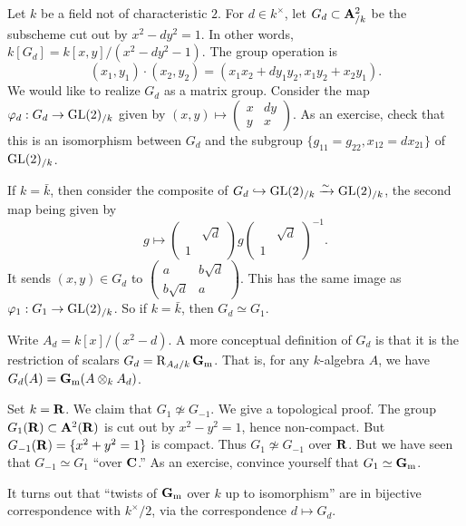 \begin{example}
Let $k$ be a field not of characteristic $2$. For $d\in k^\times$, let 
$G_d\subset \mathbf{A}_{/k}^2$ be the subscheme cut out by $x^2-d y^2=1$. In 
other words, $k[G_d]=k[x,y]/(x^2-d y^2-1)$. The group operation is 
\[
  (x_1,y_1)\cdot (x_2,y_2) = (x_1 x_2+d y_1 y_2, x_1 y_2+x_2 y_1) .
\]
We would like to realize $G_d$ as a matrix group. Consider the map 
$\varphi_d:G_d\to \operatorname{GL}(2)_{/k}$ given by 
$(x,y)\mapsto \begin{pmatrix} x & d y \\ y & x\end{pmatrix}$. As an exercise, 
check that this is an isomorphism between $G_d$ and the subgroup 
$\{g_{11}=g_{22},x_{12}=d x_{21}\}$ of $\operatorname{GL}(2)_{/k}$. 

If $k=\bar k$, then consider the composite of $G_d\hookrightarrow \operatorname{GL}(2)_{/k}\xrightarrow\sim \operatorname{GL}(2)_{/k}$, 
the second map being given by 
\[
  g\mapsto \begin{pmatrix} & \sqrt d \\ 1 \end{pmatrix} g \begin{pmatrix} & \sqrt d \\ 1 \end{pmatrix}^{-1} .
\]
It sends $(x,y)\in G_d$ to $\begin{pmatrix} a & b\sqrt d \\ b\sqrt d & a \end{pmatrix}$. 
This has the same image as $\varphi_1:G_1\to \operatorname{GL}(2)_{/k}$. So if $k=\bar k$, then 
$G_d\simeq G_1$. 
\end{example}

\begin{hard}
Write $A_d=k[x]/(x^2-d)$. A more conceptual definition of $G_d$ is that it is 
the restriction of scalars $G_d=\operatorname{R}_{A_d/k} \mathbf{G}_\mathrm{m}$. That is, for any 
$k$-algebra $A$, we have $G_d(A) = \mathbf{G}_\mathrm{m}(A\otimes_k A_d)$. 
\end{hard}

\begin{example}
Set $k=\mathbf{R}$. We claim that $G_1\not\simeq G_{-1}$. We give a topological 
proof. The group $G_1(\mathbf{R})\subset \mathbf{A}^2(\mathbf{R})$ is cut out by $x^2-y^2=1$, hence 
non-compact. But $G_{-1}(\mathbf{R})=\{x^2+y^2=1\}$ is compact. Thus 
$G_1\not\simeq G_{-1}$ over $\mathbf{R}$. 
But we have seen that $G_{-1}\simeq G_1$ ``over $\mathbf{C}$.'' As an exercise, 
convince yourself that $G_1\simeq \mathbf{G}_\mathrm{m}$. 
\end{example}

It turns out that ``twists of $\mathbf{G}_\mathrm{m}$ over $k$ up to isomorphism'' are in 
bijective correspondence with $k^\times/2$, via the correspondence 
$d\mapsto G_d$. 

